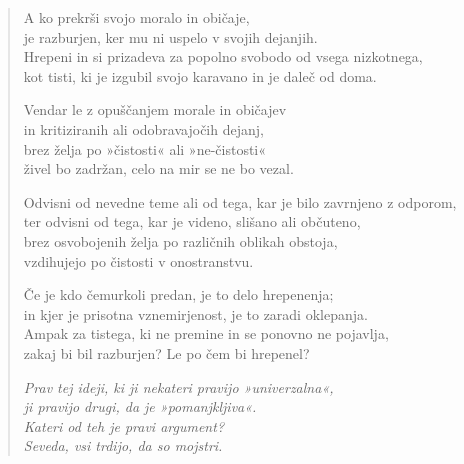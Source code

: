 \clearpage
\begin{verse}

A ko prekrši svojo moralo in običaje,\\
je razburjen, ker mu ni uspelo v svojih dejanjih.\\
Hrepeni in si prizadeva za popolno svobodo od vsega nizkotnega,\\
kot tisti, ki je izgubil svojo karavano in je daleč od doma.

Vendar le z opuščanjem morale in običajev\\
in kritiziranih ali odobravajočih dejanj,\\
brez želja po »čistosti« ali »ne-čistosti«\\
živel bo zadržan, celo na mir se ne bo vezal.

Odvisni od nevedne teme ali od tega, kar je bilo zavrnjeno z odporom,\\
ter odvisni od tega, kar je videno, slišano ali občuteno,\\
brez osvobojenih želja po različnih oblikah obstoja,\\
vzdihujejo po čistosti v onostranstvu.

Če je kdo čemurkoli predan, je to delo hrepenenja;\\
in kjer je prisotna vznemirjenost, je to zaradi oklepanja.\\
Ampak za tistega, ki ne premine in se ponovno ne pojavlja,\\
zakaj bi bil razburjen? Le po čem bi hrepenel?

\emph{Prav tej ideji, ki ji nekateri pravijo »univerzalna«,}\\
\emph{ji pravijo drugi, da je »pomanjkljiva«.}\\
\emph{Kateri od teh je pravi argument?}\\
\emph{Seveda, vsi trdijo, da so mojstri.}

\end{verse}


